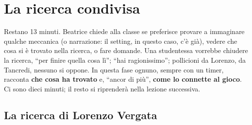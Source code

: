 \section{La ricerca condivisa}
\label{a7:sec:condivisa}

Restano 13 minuti. Beatrice chiede alla classe se preferisce provare a immaginare
qualche meccanica (o narrazione: il setting, in questo caso, c'è già), vedere che cosa
si è trovato nella ricerca, o fare domande. Una studentessa vorrebbe chiudere la
ricerca, ``per finire quella cosa lì''; ``hai ragionissimo''; pollicioni da Lorenzo,
da Tancredi, nessuno si oppone. In questa fase ognuno, sempre con un timer,
racconta \textbf{che cosa ha trovato} e, ``ancor di più'', \textbf{come lo connette al
gioco}. Ci sono dieci minuti; il resto si riprenderà nella lezione successiva.

\subsection{La ricerca di Lorenzo Vergata}
\label{a7:sec:ricerca-vergata}

